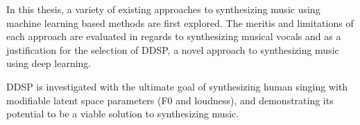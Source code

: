 In this thesis, a variety of existing approaches to synthesizing music using machine learning based methods are first explored. The meritis and limitations of each approach are evaluated in regards to synthesizing musical vocals and as a justification for the selection of DDSP, a novel approach to synthesizing music using deep learning.

DDSP is investigated with the ultimate goal of synthesizing human singing with modifiable latent space parameters (F0 and loudness), and demonstrating its potential to be a viable solution to synthesizing music.



